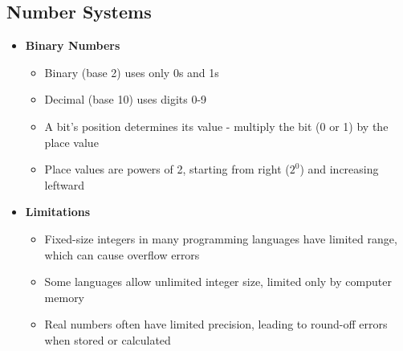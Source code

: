 \subsection*{Number Systems}
\begin{itemize}
    \item \textbf{Binary Numbers}
        \begin{itemize}
            \item Binary (base 2) uses only 0s and 1s %
            \item Decimal (base 10) uses digits 0-9 %
            \item A bit's position determines its value - multiply the bit (0 or 1) by the place value %
            \item Place values are powers of 2, starting from right ($2^0$) and increasing leftward %
        \end{itemize}
    
    \item \textbf{Limitations}
        \begin{itemize}
            \item Fixed-size integers in many programming languages have limited range, which can cause overflow errors %
            \item Some languages allow unlimited integer size, limited only by computer memory %
            \item Real numbers often have limited precision, leading to round-off errors when stored or calculated %
        \end{itemize}
\end{itemize}

